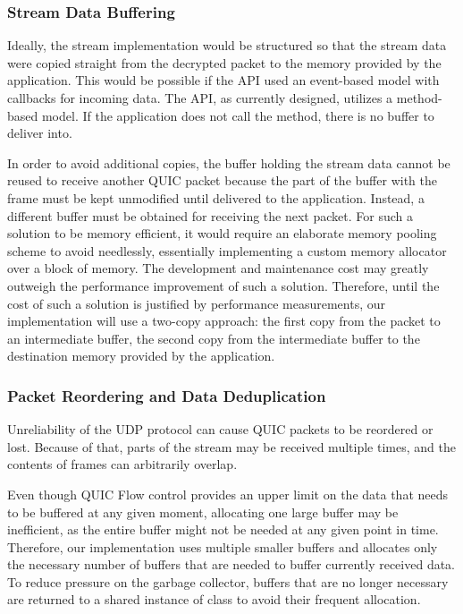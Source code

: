 \subsubsection{Stream Data Buffering}

Ideally, the stream implementation would be structured so that the stream data were copied straight
from the decrypted packet to the memory provided by the application. This would be possible if the
API used an event-based model with callbacks for incoming data. The API, as currently designed,
utilizes a method-based model. If the application does not call the  method, there
is no buffer to deliver into.

In order to avoid additional copies, the buffer holding the stream data cannot be reused to receive
another QUIC packet because the part of the buffer with the \STREAM{} frame must be kept unmodified
until delivered to the application. Instead, a different buffer must be obtained for receiving the
next packet. For such a solution to be memory efficient, it would require an elaborate memory
pooling scheme to avoid needlessly, essentially implementing a custom memory allocator over a block
of memory. The development and maintenance cost may greatly outweigh the performance improvement of
such a solution. Therefore, until the cost of such a solution is justified by performance
measurements, our implementation will use a two-copy approach: the first copy from the packet to an
intermediate buffer, the second copy from the intermediate buffer to the destination memory provided
by the application.



\subsubsection{Packet Reordering and Data Deduplication}

Unreliability of the UDP protocol can cause QUIC packets to be reordered or lost. Because of that,
parts of the stream may be received multiple times, and the contents of \STREAM{} frames can
arbitrarily overlap.

Even though QUIC Flow control provides an upper limit on the data that needs to be buffered at any
given moment, allocating one large buffer may be inefficient, as the entire buffer might not be
needed at any given point in time. Therefore, our implementation uses multiple smaller buffers and
allocates only the necessary number of buffers that are needed to buffer currently received data. To
reduce pressure on the garbage collector, buffers that are no longer necessary are returned to a
shared instance of \ArrayPoolOf{\Byte{}} class to avoid their frequent allocation.

